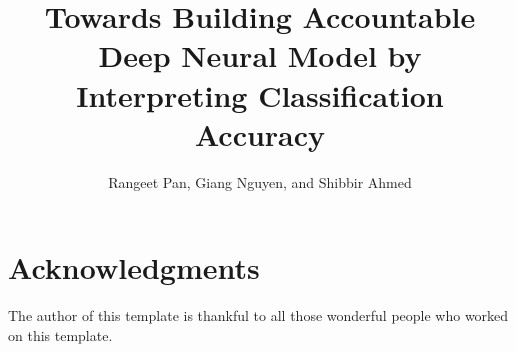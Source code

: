 \documentclass{llncs}
\begin{document}
\title{Towards Building Accountable Deep Neural Model by Interpreting Classification Accuracy}
\author{Rangeet Pan, Giang Nguyen, and Shibbir Ahmed}

%



\maketitle

\begin{abstract}

\end{abstract}

 





 
%
%
\section{Acknowledgments}

The author of this template is thankful to all those 
wonderful people who worked on this template. 


  
\end{document}
